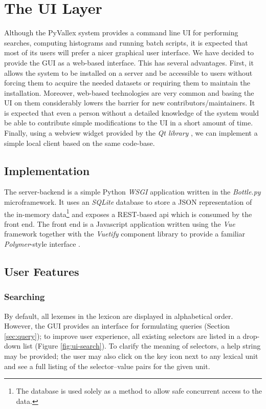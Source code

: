 \documentclass[10pt, a4paper]{article}
\begin{document}
\section{The UI Layer}

Although the PyVallex system provides a command line UI for performing searches, computing histograms
and running batch scripts, it is expected that most of its users will prefer a nicer graphical user interface.
We have decided to provide the GUI as a web-based interface. This has several advantages. First, it allows
the system to be installed on a server and be accessible to users without forcing them to acquire the needed datasets
or requiring them to maintain the installation. Moreover, web-based technologies are very
common and basing the UI on them considerably lowers the barrier for new contributors/maintainers. It
is expected that even a person without a detailed knowledge of the system would be able to contribute simple modifications to the UI in a short amount of time. Finally, using a webview widget provided by the
\emph{Qt library} \cite{tool:Qt},
we can implement a simple local client based on the same code-base.

\subsection{Implementation}
The server-backend is a simple Python \emph{WSGI} \cite{tool:WSGI} application written in the \emph{Bottle.py} \cite{tool:bottle.py}
microframework. It uses an \emph{SQLite} database \cite{tool:SQLite} to store a JSON representation of the in-memory
data\footnote{The database is used solely as a method to allow safe concurrent access to the data.} and exposes a REST-based api which is consumed by the front end. The front end is a Javascript application written using the
\emph{Vue} framework \cite{tool:vue}  together with the
\emph{Vuetify} component library \cite{tool:Vuetify} to provide a familiar
\emph{Polymer}-style interface \cite{tool:polymer}.

\subsection{User Features}
\subsubsection{Searching}
By default, all lexemes in the lexicon are displayed in alphabetical order.
However, the GUI provides an interface for formulating queries (Section \ref{sec:query});
to improve user experience, all existing selectors are listed in a drop-down list (Figure \ref{fig:ui-search}).
To clarify the meaning of selectors, a help string may be provided;
the user may also click on the key icon next to any lexical unit
and see a full listing of the selector--value pairs for the given unit.
\end{document}
